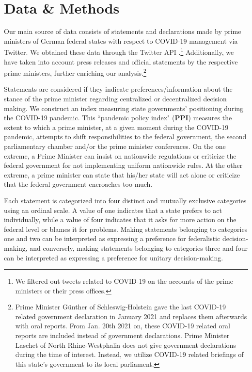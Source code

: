 \documentclass[authoryear,12pt, 3p]{elsarticle} %
\theoremstyle{break}
\begin{document}
\section{Data \& Methods}\label{sec.datamethods}
Our main source of data consists of statements and declarations made by prime ministers of German federal states with respect to COVID-19 management via Twitter. We obtained these data through the Twitter API \citep{Kearney2019}.\footnote{
	We filtered out tweets related to COVID-19 on the accounts of the prime ministers or their press offices.
} Additionally, we have taken into account press releases and official statements by the respective prime ministers, further enriching our analysis.\footnote{
	Prime Minister Günther of Schleswig-Holstein gave the last COVID-19 related government declaration in January 2021 and replaces them afterwards with oral reports. From Jan. 20th 2021 on, these COVID-19 related oral reports are included instead of government declarations. Prime Minister Laschet of North Rhine-Westphalia does not give government declarations during the time of interest. Instead, we utilize COVID-19 related briefings of this state’s government to its local parliament.}

Statements are considered if they indicate preferences/information about the stance of the prime minister regarding centralized or decentralized decision making. We construct an index measuring state governments’ positioning during the COVID-19 pandemic. This ``pandemic policy index" (\textbf{PPI}) measures the extent to which a prime minister, at a given moment during the COVID-19 pandemic, attempts to shift responsibilities to the federal government, the second parliamentary chamber and/or the prime minister conferences. On the one extreme, a Prime Minister can insist on nationwide regulations or criticize the federal government for not implementing uniform nationwide rules. At the other extreme, a prime minister can state that his/her state will act alone or criticize that the federal government encroaches too much.

Each statement is categorized into four distinct and mutually exclusive categories using an ordinal scale. A value of one indicates that a state prefers to act individually, while a value of four indicates that it asks for more action on the federal level or blames it for problems. Making statements belonging to categories one and two can be interpreted as expressing a preference for federalistic decision-making, and conversely, making statements belonging to categories three and four can be interpreted as expressing a preference for unitary decision-making.
\end{document}

